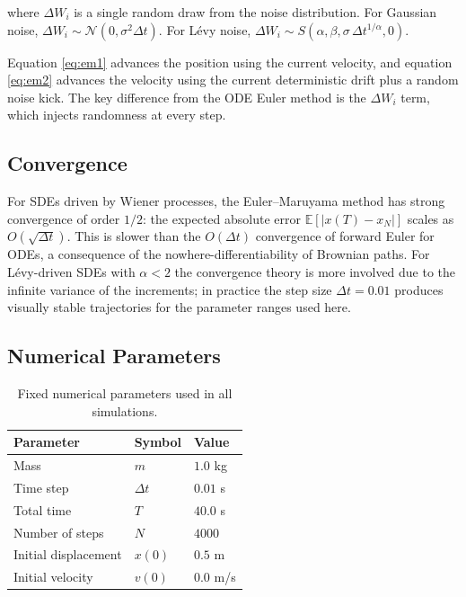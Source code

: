 \documentclass[12pt]{article}
\begin{document}
where $\Delta W_i$ is a single random draw from the noise distribution.
For Gaussian noise, $\Delta W_i \sim \mathcal{N}(0, \sigma^2\Delta t)$.
For L\'{e}vy noise,
$\Delta W_i \sim S(\alpha, \beta, \sigma\,\Delta t^{1/\alpha}, 0)$.

Equation \eqref{eq:em1} advances the position using the current velocity,
and equation \eqref{eq:em2} advances the velocity using the current
deterministic drift plus a random noise kick. The key difference from the
ODE Euler method is the $\Delta W_i$ term, which injects randomness
at every step.

\subsection{Convergence}

For SDEs driven by Wiener processes, the Euler--Maruyama method has strong
convergence of order $1/2$: the expected absolute error
$\mathbb{E}[|x(T) - x_N|]$ scales as $O(\sqrt{\Delta t})$.
This is slower than the $O(\Delta t)$ convergence of forward Euler for ODEs,
a consequence of the nowhere-differentiability of Brownian paths.
For L\'{e}vy-driven SDEs with $\alpha < 2$ the convergence theory is more
involved due to the infinite variance of the increments; in practice the
step size $\Delta t = 0.01$ produces visually stable trajectories for the
parameter ranges used here.

\subsection{Numerical Parameters}

\begin{table}[H]
    \centering
    \begin{tabular}{lll}
        \hline
        \textbf{Parameter}    & \textbf{Symbol}  & \textbf{Value} \\
        \hline
        Mass                  & $m$              & $1.0$ kg \\
        Time step             & $\Delta t$       & $0.01$ s \\
        Total time            & $T$              & $40.0$ s \\
        Number of steps       & $N$              & $4000$ \\
        Initial displacement  & $x(0)$           & $0.5$ m \\
        Initial velocity      & $v(0)$           & $0.0$ m/s \\
        \hline
    \end{tabular}
    \caption{Fixed numerical parameters used in all simulations.}
    \label{tab:num_params}
\end{table}
\end{document}
